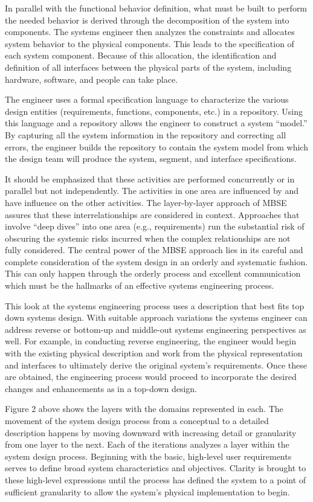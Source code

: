 In parallel with the functional behavior definition, what must be built to perform the needed behavior is derived through the decomposition of the system into components. The systems engineer then analyzes the constraints and allocates system behavior to the physical components. This leads to the specification of each system component. Because of this allocation, the identification and definition of all interfaces between the physical parts of the system, including hardware, software, and people can take place. 

The engineer uses a formal specification language to characterize the various design entities (requirements, functions, components, etc.) in a repository. Using this language and a repository allows the engineer to construct a system ``model.'' By capturing all the system information in the repository and correcting all errors, the engineer builds the repository to contain the system model from which the design team will produce the system, segment, and interface specifications.

It should be emphasized that these activities are performed concurrently or in parallel but not independently. The activities in one area are influenced by and have influence on the other activities. The layer-by-layer approach of MBSE assures that these interrelationships are considered in context. Approaches that involve ``deep dives'' into one area (e.g., requirements) run the substantial risk of obscuring the systemic risks incurred when the complex relationships are not fully considered. The central power of the MBSE approach lies in its careful and complete consideration of the system design in an orderly and systematic fashion. This can only happen through the orderly process and excellent communication which must be the hallmarks of an effective systems engineering process. 

This look at the systems engineering process uses a description that best fits top down systems design. With suitable approach variations the systems engineer can address reverse or bottom-up and middle-out systems engineering perspectives as well. For example, in conducting reverse engineering, the engineer would begin with the existing physical description and work from the physical representation and interfaces to ultimately derive the original system’s requirements. Once these are obtained, the engineering process would proceed to incorporate the desired changes and enhancements as in a top-down design.

Figure 2 above shows the layers with the domains represented in each. The movement of the system design process from a conceptual to a detailed description happens by moving downward with increasing detail or granularity from one layer to the next. Each of the iterations analyzes a layer within the system design process. Beginning with the basic, high-level user requirements serves to define broad system characteristics and objectives. Clarity is brought to these high-level expressions until the process has defined the system to a point of sufficient granularity to allow the system’s physical implementation to begin.

